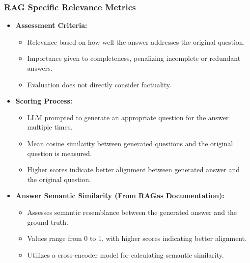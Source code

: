 \begin{frame}[fragile]\frametitle{RAG Specific Relevance Metrics}
  \begin{itemize}
    \item \textbf{Assessment Criteria:}
      \begin{itemize}
        \item Relevance based on how well the answer addresses the original question.
        \item Importance given to completeness, penalizing incomplete or redundant answers.
        \item Evaluation does not directly consider factuality.
      \end{itemize}
    \item \textbf{Scoring Process:}
      \begin{itemize}
        \item LLM prompted to generate an appropriate question for the answer multiple times.
        \item Mean cosine similarity between generated questions and the original question is measured.
        \item Higher scores indicate better alignment between generated answer and the original question.
      \end{itemize}
    \item \textbf{Answer Semantic Similarity (From RAGas Documentation):}
      \begin{itemize}
        \item Assesses semantic resemblance between the generated answer and the ground truth.
        \item Values range from 0 to 1, with higher scores indicating better alignment.
        \item Utilizes a cross-encoder model for calculating semantic similarity.
      \end{itemize}
  \end{itemize}
\end{frame}


